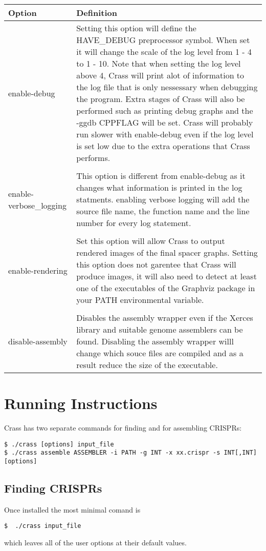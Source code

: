 \documentclass[11pt]{article} %
\begin{document}
    \begin{longtable}{  l    p{10cm} }
    \hline
    Option & Definition \\  \hline\hline
    enable-debug &   Setting this option will define the HAVE\_DEBUG preprocessor symbol.  When set it will change the scale of the log level from 1 - 4 to 1 - 10.  Note that when setting the log level above 4, Crass will print alot of information to the log file that is only nessessary when debugging the program.  Extra stages of Crass will also be performed such as printing debug graphs and the -ggdb CPPFLAG will be set.  Crass will probably run slower with enable-debug even if the log level is set low due to the extra operations that Crass performs.\\ \\
   enable-verbose\_logging & This option is different from enable-debug as it changes what information is printed in the log statments.  enabling verbose logging will add the source file name, the function name and the line number for every log statement. \\ \\    
enable-rendering &  Set this option will allow Crass to output rendered images of the final spacer graphs.  Setting this option does not garentee that Crass will produce images, it will also need to detect at least one of the executables of the Graphviz package in your PATH environmental variable. \\  \\
   disable-assembly & Disables the assembly wrapper even if the Xerces library and suitable genome assemblers can be found.  Disabling the assembly wrapper willl change which souce files are compiled and as a result reduce the size of the executable. \\ 

    \hline
    \end{longtable}

\section{Running Instructions}
Crass has two separate commands for finding and for assembling CRISPRs:
 \begin{lstlisting}[basicstyle=\footnotesize]
$ ./crass [options] input_file
$ ./crass assemble ASSEMBLER -i PATH -g INT -x xx.crispr -s INT[,INT] [options]
\end{lstlisting}
\subsection{Finding CRISPRs}
Once installed the most minimal comand is 
\begin{lstlisting}[basicstyle=\footnotesize]
$  ./crass input_file
\end{lstlisting}
which leaves all of the user options at their default values.
\end{document}
